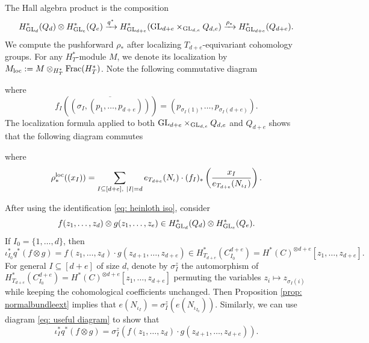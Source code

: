 \documentclass[10pt]{amsart}
\newcommand{\+}{{}^+}
\newcommand{\GL}{\textnormal{GL}}
\newcommand{\loc}{\textnormal{loc}}
\theoremstyle{definition}
\theoremstyle {definition}
\theoremstyle {definition}
\begin{document}
The Hall algebra product is the composition
$$H^*_{\GL_d}(Q_d)\otimes H^*_{\GL_e}(Q_e)\xrightarrow{q^*}
H^*_{\GL_{d+e}}(\GL_{d+e}\times_{\GL_{d,e}}Q_{d,e})
\xrightarrow{\rho_*}H^*_{\GL_{d+e}}(Q_{d+e}). 
$$
We compute the pushforward $\rho_*$ after localizing $T_{d+e}$-equivariant cohomology groups. For any $H^*_T$-module $M$, we denote its localization by $M_\loc:=M\otimes_{H^*_T} \textnormal{Frac}(H^*_T)$. Note the following commutative diagram 
\begin{center}
\end{center}
where
$$f_I(\overline{(\sigma_I,(p_1,\dots,p_{d+e}))})=(p_{\sigma_I(1)},\dots, p_{\sigma_{I}(d+e)}).$$
The localization formula applied to both $\GL_{d+e}\times_{\GL_{d,e}}Q_{d,e}$ and $Q_{d+e}$ shows that the following diagram commutes
\begin{center}
\end{center}
where 
$$\rho^\loc_*((x_I))=\sum_{I\subseteq[d+e],\ |I|=d} e_{T_{d+e}}(N_\iota)\cdot (f_I)_*\left(\frac{x_I}{e_{T_{d+e}}(N_{\iota_I})}\right). 
$$

After using the identification \eqref{eq: heinloth iso}, consider 
$$f(z_1,\dots, z_d)\otimes g(z_1,\dots, z_e)\in H^*_{\GL_d}(Q_d)\otimes H^*_{\GL_e}(Q_e). 
$$
If $I_0=\{1, \dots, d\}$, then 
$$\iota_{I_0}^* q^*(f\otimes g)= f(z_1,\dots, z_d)\cdot g(z_{d+1},\dots, z_{d+e})\in H^*_{T_{d+e}}(C^{d+e}_{I_0})=H^*(C)^{\otimes d+e}[z_1,\dots, z_{d+e}]. 
$$
For general $I\subseteq[d+e]$ of size $d$, denote by $\sigma_I^z$ the automorphism of $H^*_{T_{d+e}}(C^{d+e}_{I_0})=H^*(C)^{\otimes d+e}[z_1,\dots, z_{d+e}]$ permuting the variables $z_i\mapsto z_{\sigma_I(i)}$ while keeping the cohomological coefficients unchanged. Then Proposition \ref{prop: normalbundleext} implies that $e(N_{\iota_I})=\sigma_I^z(e(N_{\iota_{I_0}}))$. Similarly, we can use diagram \eqref{eq: useful diagram} to show that 
$$\iota_{I}^* q^*(f\otimes g)= \sigma^z_I(f(z_1,\dots, z_d)\cdot g(z_{d+1},\dots, z_{d+e})). 
$$
\end{document}
